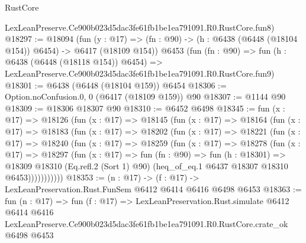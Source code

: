 \begin{lexlean}{RustCore}
\begin{coremodule}
    LexLeanPreserve.Ce900b023d5dac3fe61fb1be1ea791091.R0.RustCore.fun8)
@18297 := @18094
    (fun (y : @17) => (fn : @90) -> (h : @6438 (@6448 (@18104 @154)) @6454) -> @6417 (@18109 @154))
    @6453
    (fun (fn : @90) =>
    fun (h : @6438 (@6448 (@18118 @154)) @6454) =>
    LexLeanPreserve.Ce900b023d5dac3fe61fb1be1ea791091.R0.RustCore.fun9)
@18301 := @6438 (@6448 (@18104 @159)) @6454
@18306 := Option.noConfusion.{0, 0} (@6417 (@18109 @159)) @90
@18307 := @1144 @90
@18309 := @18306 @18307 @90
@18310 := @6452 @6498
@18345 := fun (x : @17) =>
  @18126
    (fun (x : @17) =>
    @18145
      (fun (x : @17) =>
      @18164
        (fun (x : @17) =>
        @18183
          (fun (x : @17) =>
          @18202
            (fun (x : @17) =>
            @18221
              (fun (x : @17) =>
              @18240
                (fun (x : @17) =>
                @18259
                  (fun (x : @17) =>
                  @18278
                    (fun (x : @17) =>
                    @18297
                      (fun (x : @17) =>
                      fun (fn : @90) =>
                      fun (h : @18301) =>
                      @18309
                        @18310
                        (Eq.refl.{2} (Sort 1) @90)
                        (heq_of_eq.{1} @6437 @18307 @18310 @6453)))))))))))
@18353 := (n : @17) -> (f : @17) -> LexLeanPreservation.Rust.FunSem @6412 @6414 @6416 @6498 @6453
@18363 := fun (n : @17) =>
  fun (f : @17) =>
  LexLeanPreservation.Rust.simulate
    @6412
    @6414
    @6416
    LexLeanPreserve.Ce900b023d5dac3fe61fb1be1ea791091.R0.RustCore.crate_ok
    @6498
    @6453
\end{coremodule}
\end{lexlean}
